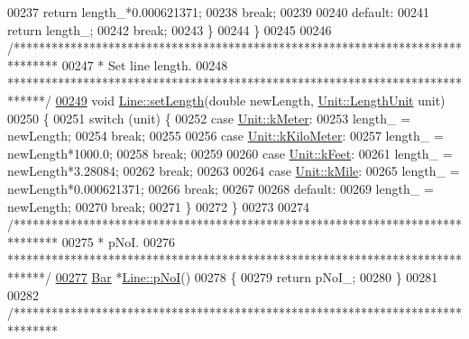 \begin{DoxyCode}
00237     \textcolor{keywordflow}{return} length\_*0.000621371;
00238     \textcolor{keywordflow}{break};
00239 
00240   \textcolor{keywordflow}{default}:
00241     \textcolor{keywordflow}{return} length\_;
00242     \textcolor{keywordflow}{break};
00243   \}
00244 \}
00245 
00246 \textcolor{comment}{/*******************************************************************************}
00247 \textcolor{comment}{ * Set line length.}
00248 \textcolor{comment}{ ******************************************************************************/}
\hypertarget{line_8cpp_source_l00249}{}\hyperlink{group___models_ga950d0b8f5d167eda430c65ca7adadbb0}{00249} \textcolor{keywordtype}{void} \hyperlink{group___models_ga950d0b8f5d167eda430c65ca7adadbb0}{Line::setLength}(\textcolor{keywordtype}{double} newLength, \hyperlink{class_unit_a8c8921f7b225ad6063b1cb573425b9a0}{Unit::LengthUnit} unit)
00250 \{
00251   \textcolor{keywordflow}{switch} (unit) \{
00252   \textcolor{keywordflow}{case} \hyperlink{class_unit_a8c8921f7b225ad6063b1cb573425b9a0abfa41ebe7ee649a1f02c9b8ae570434b}{Unit::kMeter}:
00253     length\_ = newLength;
00254     \textcolor{keywordflow}{break};
00255 
00256   \textcolor{keywordflow}{case} \hyperlink{class_unit_a8c8921f7b225ad6063b1cb573425b9a0a1c04f3dd196dbe1832a2658215b0d919}{Unit::kKiloMeter}:
00257     length\_ = newLength*1000.0;
00258     \textcolor{keywordflow}{break};
00259 
00260   \textcolor{keywordflow}{case} \hyperlink{class_unit_a8c8921f7b225ad6063b1cb573425b9a0a9ac9b167b0ebce477fb53d6ace04ddc8}{Unit::kFeet}:
00261     length\_ = newLength*3.28084;
00262     \textcolor{keywordflow}{break};
00263 
00264   \textcolor{keywordflow}{case} \hyperlink{class_unit_a8c8921f7b225ad6063b1cb573425b9a0a2ebde742068bbee0510de32fbb4cd724}{Unit::kMile}:
00265     length\_ = newLength*0.000621371;
00266     \textcolor{keywordflow}{break};
00267 
00268   \textcolor{keywordflow}{default}:
00269     length\_ = newLength;
00270     \textcolor{keywordflow}{break};
00271   \}
00272 \}
00273 
00274 \textcolor{comment}{/*******************************************************************************}
00275 \textcolor{comment}{ * pNoI.}
00276 \textcolor{comment}{ ******************************************************************************/}
\hypertarget{line_8cpp_source_l00277}{}\hyperlink{group___models_gaeafd90e84ac2f8de2a879abe9e53eef3}{00277} \hyperlink{class_bar}{Bar} *\hyperlink{group___models_gaeafd90e84ac2f8de2a879abe9e53eef3}{Line::pNoI}()
00278 \{
00279   \textcolor{keywordflow}{return} pNoI\_;
00280 \}
00281 
00282 \textcolor{comment}{/*******************************************************************************}

\end{DoxyCode}
